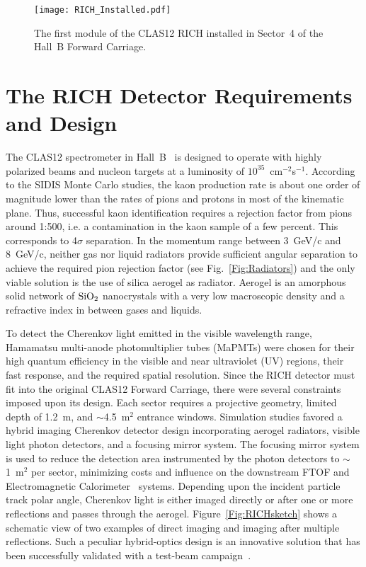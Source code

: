 \documentclass[5p,times,twocolumn]{elsarticle}
\begin{document}
\begin{figure}[th]
\begin{center}
\texttt{[image: RICH\_Installed.pdf]}
\end{center}
\caption{The first module of the CLAS12 RICH installed in Sector~4 of the Hall~B Forward Carriage.}
\label{Fig:RICHPic}
\end{figure}

\section{The RICH Detector Requirements and Design}

The CLAS12 spectrometer in Hall~B~\cite{REF:overview-nim} is designed to operate with highly polarized beams and
nucleon targets at a luminosity of $10^{35}$~cm$^{-2}$s$^{-1}$. 
According to the SIDIS Monte Carlo studies, the kaon production rate is about one order of magnitude lower
than the rates of pions and protons in most of the kinematic plane. 
Thus, successful kaon identification requires
a rejection factor from pions around 1:500, i.e. a contamination in the kaon sample of a few percent. This corresponds to
4$\sigma$ separation. In the momentum range between 3~GeV/c and 8~GeV/c, neither gas nor liquid radiators provide sufficient
angular separation to achieve the required pion rejection factor (see Fig.~\ref{Fig:Radiators}) and the only viable
solution is the use of silica aerogel as radiator. Aerogel is an amorphous solid network of $\rm SiO_2$ nanocrystals 
with a very low macroscopic density and a refractive index in between gases and liquids.

To detect the Cherenkov light emitted in the visible wavelength
range, Hamamatsu multi-anode photomultiplier tubes (MaPMTs) were chosen for their high quantum efficiency in the
visible and near ultraviolet (UV) regions, their fast response, and the required spatial resolution. Since the RICH
detector must fit into the original CLAS12 Forward Carriage, there were several constraints imposed upon its design.
Each sector requires a projective geometry, limited depth of 1.2~m, and $\sim$4.5~m$^2$ entrance windows.
Simulation studies favored a hybrid imaging Cherenkov detector design incorporating aerogel radiators, visible light
photon detectors, and a focusing mirror system. The focusing mirror system is used to reduce the detection area
instrumented by the photon detectors to $\sim$1~m$^2$ per sector, minimizing costs and influence on the downstream FTOF and
Electromagnetic Calorimeter~\cite{REF:ecal-nim} systems. Depending upon the incident particle track
polar angle, Cherenkov light is either imaged directly or after one or more reflections and passes through the aerogel.
Figure~\ref{Fig:RICHsketch} shows a schematic view of two examples of direct imaging and imaging after multiple
reflections. Such a peculiar hybrid-optics design is an innovative solution that has been successfully validated with 
a test-beam campaign~\cite{REF:RICH2013}. 
\end{document}
